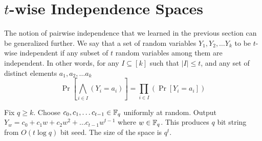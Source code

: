 \begin{curiousity}
\end{curiousity}

\section{$t$-wise Independence Spaces}

The notion of pairwise independence that we learned in the previous section can be generalized further. We say that a set of random variables $Y_1, Y_2, \ldots Y_k$ to be $t$-wise independent if any subset of $t$ random variables among them are independent. In other words, for any $I \subseteq [k]$ such that $|I|\le t$, and any set of distinct elements $a_1, a_2, \ldots a_k$ 
\begin{equation}
\Pr\left[ \bigwedge_{i\in I} (Y_i = a_i) \right] = \prod_{i \in I}\left(\Pr\left[ Y_i = a_i \right]\right)
\label{eqn:twise-indep}
\end{equation}

\begin{definition}
Fix $q \ge k$. Choose $c_0, c_1, \ldots c_{t-1} \in {\mathbb{F}}_q$ uniformly at random. Output $Y_w = c_0+c_1w+c_2w^2+ \ldots c_{t-1}w^{t-1}$ where $w \in {\mathbb{F}}_q$. This produces $q$ bit string from $O(t\log q)$ bit seed. The size of the space is $q^t$.
\end{definition}

